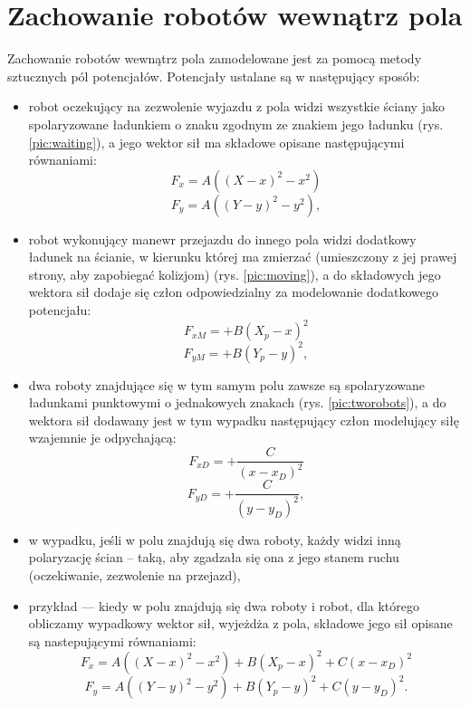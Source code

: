 \section{Zachowanie robotów wewnątrz pola}
	Zachowanie robotów wewnątrz pola zamodelowane jest za pomocą metody sztucznych pól potencjałów. Potencjały ustalane są w następujący sposób:
	\begin{itemize}
		\item robot oczekujący na zezwolenie wyjazdu z pola widzi wszystkie ściany jako spolaryzowane ładunkiem o znaku zgodnym ze znakiem jego ładunku (rys. \ref{pic:waiting}), a jego wektor sił ma składowe opisane następującymi równaniami:
                  $$F_x= A((X-x)^2 - x^2)$$
                  $$F_y= A((Y-y)^2 - y^2),$$
		\item robot wykonujący manewr przejazdu do innego pola widzi dodatkowy ładunek na ścianie, w kierunku której ma zmierzać (umieszczony z jej prawej strony, aby zapobiegać kolizjom) (rys. \ref{pic:moving}), a do składowych jego wektora sił dodaje się człon odpowiedzialny za modelowanie dodatkowego potencjału:
                  $$F_{xM}= +B(X_p-x)^2$$
                  $$F_{yM}= +B(Y_p-y)^2,$$
		\item dwa roboty znajdujące się w tym samym polu zawsze są spolaryzowane ładunkami punktowymi o jednakowych znakach (rys. \ref{pic:tworobots}), a do wektora sił dodawany jest w tym wypadku następujący człon modelujący siłę wzajemnie je odpychającą:
                  $$F_{xD}= +\frac{C}{(x-x_D)^2}$$
                  $$F_{yD}= +\frac{C}{(y-y_D)^2},$$ 
		\item w wypadku, jeśli w polu znajdują się dwa roboty, każdy widzi inną polaryzację ścian -- taką, aby zgadzała się ona z jego stanem ruchu (oczekiwanie, zezwolenie na przejazd),
                \item przykład --- kiedy w polu znajdują się dwa roboty i robot, dla którego obliczamy wypadkowy wektor sił, wyjeżdża z pola, składowe jego sił opisane są nastepującymi równaniami:
                  $$F_x= A((X-x)^2 - x^2)+B(X_p-x)^2+C(x-x_D)^2$$
                  $$F_y= A((Y-y)^2 - y^2)+B(Y_p-y)^2+C(y-y_D)^2.$$ 
	\end{itemize}
	
